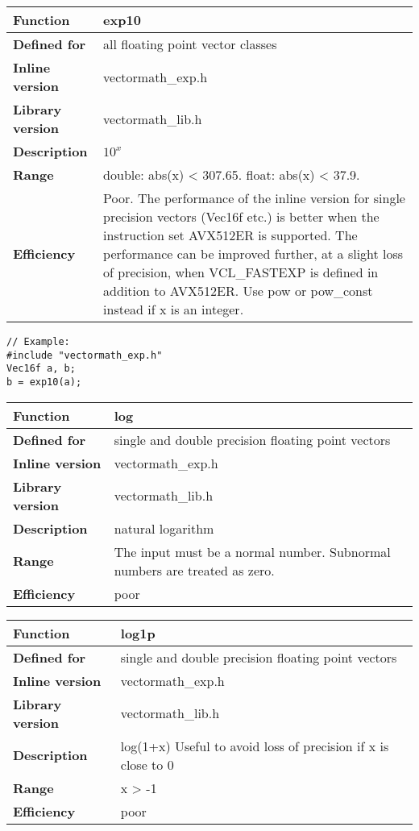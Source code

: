 \documentclass[vcl_manual.tex]{subfiles}
\begin{document}
\begin{tabular}{|p{30mm}|p{120mm}|}
\hline
\bfseries Function & exp10 \\ \hline
\bfseries Defined for & all floating point vector classes \\ \hline
\bfseries Inline version & vectormath\_exp.h \\ \hline
\bfseries Library version & vectormath\_lib.h \\ \hline
\bfseries Description & $10^x$ \\ \hline
\bfseries Range & double: abs(x) \textless{} 307.65. float: abs(x) \textless{} 37.9. \\ \hline
\bfseries Efficiency & Poor. The performance of the inline version for single precision vectors (Vec16f etc.) is better when the instruction set AVX512ER is supported. The performance can be improved further, at a slight loss of precision, when VCL\_FASTEXP is defined in addition to AVX512ER. \newline
Use pow or pow\_const instead if x is an integer. \\ \hline
\end{tabular}
\begin{lstlisting}[frame=none]
// Example:
#include "vectormath_exp.h"
Vec16f a, b;
b = exp10(a); 
\end{lstlisting}


\begin{tabular}{|p{30mm}|p{120mm}|}
\hline
\bfseries Function & log \\ \hline
\bfseries Defined for & single and double precision floating point vectors \\ \hline
\bfseries Inline version & vectormath\_exp.h \\ \hline
\bfseries Library version & vectormath\_lib.h \\ \hline
\bfseries Description & natural logarithm \\ \hline
\bfseries Range & The input must be a normal number. Subnormal numbers are treated as zero. \\ \hline
\bfseries Efficiency & poor \\ \hline
\end{tabular}


\begin{tabular}{|p{30mm}|p{120mm}|}
\hline
\bfseries Function & log1p \\ \hline
\bfseries Defined for & single and double precision floating point vectors \\ \hline
\bfseries Inline version & vectormath\_exp.h \\ \hline
\bfseries Library version & vectormath\_lib.h \\ \hline
\bfseries Description & log(1+x) \newline
Useful to avoid loss of precision if x is close to 0 \\ \hline
\bfseries Range & x \textgreater{} -1 \\ \hline
\bfseries Efficiency & poor \\ \hline
\end{tabular}
\end{document}
